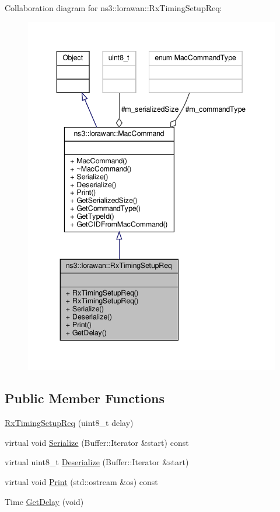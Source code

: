Collaboration diagram for ns3\+:\+:lorawan\+:\+:Rx\+Timing\+Setup\+Req\+:
\nopagebreak
\begin{figure}[H]
\begin{center}
\leavevmode
\includegraphics[width=343pt]{classns3_1_1lorawan_1_1RxTimingSetupReq__coll__graph}
\end{center}
\end{figure}
\subsection*{Public Member Functions}
\begin{DoxyCompactItemize}
\item 
\hyperlink{classns3_1_1lorawan_1_1RxTimingSetupReq_afc2307d4f27e6084ef9099498304fb13}{Rx\+Timing\+Setup\+Req} (uint8\+\_\+t delay)
\item 
virtual void \hyperlink{classns3_1_1lorawan_1_1RxTimingSetupReq_a9c19bbf820d8e943a8426d127f4fa3f6}{Serialize} (Buffer\+::\+Iterator \&start) const
\item 
virtual uint8\+\_\+t \hyperlink{classns3_1_1lorawan_1_1RxTimingSetupReq_aeee7f2141079bc7cd2471a42e2199715}{Deserialize} (Buffer\+::\+Iterator \&start)
\item 
virtual void \hyperlink{classns3_1_1lorawan_1_1RxTimingSetupReq_a8fa4e7482550477e2a5a2193e8429b69}{Print} (std\+::ostream \&os) const
\item 
Time \hyperlink{classns3_1_1lorawan_1_1RxTimingSetupReq_ae9c9dcc8cb7fad96159ca8af53e4db32}{Get\+Delay} (void)
\end{DoxyCompactItemize}
